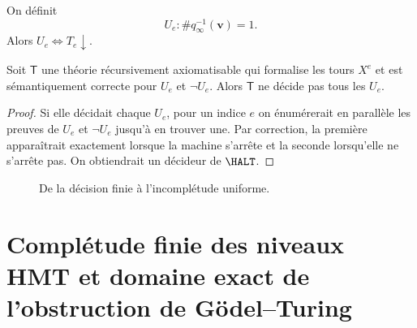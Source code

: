 On définit
\[
  U_e:\#q_\infty^{-1}(\boldsymbol v)=1.
\]
Alors \(U_e\iff T_e\downarrow\).

\begin{theorem}
\label{p3-83-c46-s1:thm:uniform-incompleteness}
Soit \(\mathsf T\) une théorie récursivement axiomatisable qui formalise les
tours \(X^e\) et est sémantiquement correcte pour \(U_e\) et
\(\neg U_e\). Alors \(\mathsf T\) ne décide pas tous les \(U_e\).
\end{theorem}

\begin{proof}
Si elle décidait chaque \(U_e\), pour un indice \(e\) on énumérerait en parallèle
les preuves de \(U_e\) et \(\neg U_e\) jusqu'à en trouver une. Par correction,
la première apparaîtrait exactement lorsque la machine s'arrête et la seconde
lorsqu'elle ne s'arrête pas. On obtiendrait un décideur de \(\HALT\).
\end{proof}

\begin{figure}[H]
\centering
{}
\caption{De la décision finie à l'incomplétude uniforme.}
\label{p3-83-c46-s1:fig:godel-turing}
\end{figure}

\section{Complétude finie des niveaux HMT et domaine exact de l'obstruction de Gödel--Turing}

